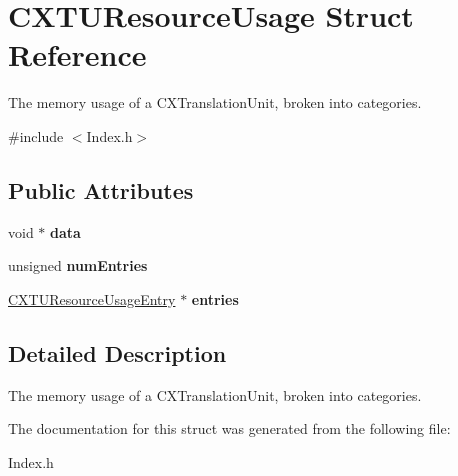 \hypertarget{structCXTUResourceUsage}{}\section{C\+X\+T\+U\+Resource\+Usage Struct Reference}
\label{structCXTUResourceUsage}


The memory usage of a C\+X\+Translation\+Unit, broken into categories.  




{\ttfamily \#include $<$Index.\+h$>$}

\subsection*{Public Attributes}
\begin{DoxyCompactItemize}
\item 
\mbox{\label{structCXTUResourceUsage_a56d46172a9121cdf6748f544ba4feb2a}} 
void $\ast$ {\bfseries data}
\item 
\mbox{\label{structCXTUResourceUsage_a0cc8e6220236ac79be31d7b91f0732d5}} 
unsigned {\bfseries num\+Entries}
\item 
\mbox{\label{structCXTUResourceUsage_a00d8889f2349ce44ed2087de98b525b2}} 
\mbox{\hyperlink{structCXTUResourceUsageEntry}{C\+X\+T\+U\+Resource\+Usage\+Entry}} $\ast$ {\bfseries entries}
\end{DoxyCompactItemize}


\subsection{Detailed Description}
The memory usage of a C\+X\+Translation\+Unit, broken into categories. 

The documentation for this struct was generated from the following file\+:\begin{DoxyCompactItemize}
\item 
Index.\+h\end{DoxyCompactItemize}
